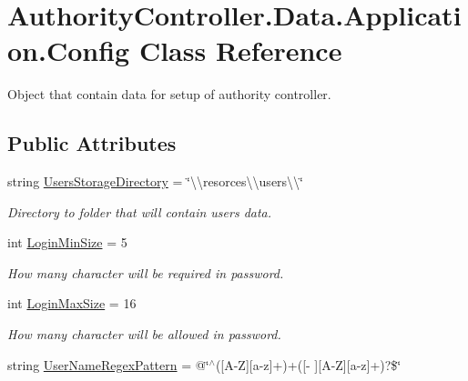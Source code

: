 \hypertarget{class_authority_controller_1_1_data_1_1_application_1_1_config}{}\section{Authority\+Controller.\+Data.\+Application.\+Config Class Reference}
\label{class_authority_controller_1_1_data_1_1_application_1_1_config}


Object that contain data for setup of authority controller.  


\subsection*{Public Attributes}
\begin{DoxyCompactItemize}
\item 
string \mbox{\hyperlink{class_authority_controller_1_1_data_1_1_application_1_1_config_a9889d48151e034f0bc451126058a5264}{Users\+Storage\+Directory}} = \char`\"{}\textbackslash{}\textbackslash{}resorces\textbackslash{}\textbackslash{}users\textbackslash{}\textbackslash{}\char`\"{}
\begin{DoxyCompactList}\small\item\em Directory to folder that will contain users data. \end{DoxyCompactList}\item 
int \mbox{\hyperlink{class_authority_controller_1_1_data_1_1_application_1_1_config_a0cdcdcfb29481fdcd78202203d10d53c}{Login\+Min\+Size}} = 5
\begin{DoxyCompactList}\small\item\em How many character will be required in password. \end{DoxyCompactList}\item 
int \mbox{\hyperlink{class_authority_controller_1_1_data_1_1_application_1_1_config_a0ad628b23000c825b59e4755c10e70fe}{Login\+Max\+Size}} = 16
\begin{DoxyCompactList}\small\item\em How many character will be allowed in password. \end{DoxyCompactList}\item 
string \mbox{\hyperlink{class_authority_controller_1_1_data_1_1_application_1_1_config_a91b4d10af2d9680e0580c5fe30b09fc8}{User\+Name\+Regex\+Pattern}} = @\char`\"{}$^\wedge$(\mbox{[}A-\/Z\mbox{]}\mbox{[}a-\/z\mbox{]}+)+(\mbox{[}-\/\textquotesingle{} \mbox{]}\mbox{[}A-\/Z\mbox{]}\mbox{[}a-\/z\mbox{]}+)?\$\char`\"{}

\end{DoxyCompactItemize}
